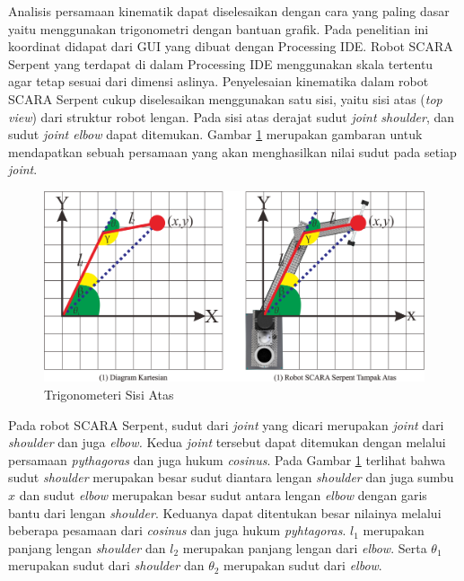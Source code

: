 Analisis persamaan kinematik dapat diselesaikan dengan cara yang paling dasar yaitu menggunakan trigonometri dengan bantuan grafik. Pada penelitian ini koordinat didapat dari GUI yang dibuat dengan Processing IDE. Robot SCARA Serpent yang terdapat di dalam Processing IDE menggunakan skala tertentu agar tetap sesuai dari dimensi aslinya. Penyelesaian kinematika dalam robot SCARA Serpent cukup diselesaikan menggunakan satu sisi, yaitu sisi atas (\textit{top view}) dari struktur robot lengan. Pada sisi atas derajat sudut \textit{joint} \textit{shoulder}, dan sudut \textit{joint elbow} dapat ditemukan. Gambar \ref{pic.perskinematikabalik} merupakan gambaran untuk mendapatkan sebuah persamaan yang akan menghasilkan nilai sudut pada setiap \textit{joint\cite{koker}}.
\begin{figure}[H]
	\centering
	\includegraphics[width=12cm]{gambar/SCARA_atas.png}
	\caption{Trigonometeri Sisi Atas}
	\label{pic.perskinematikabalik}
\end{figure}


Pada robot SCARA Serpent, sudut dari \textit{joint} yang dicari merupakan \textit{joint} dari \textit{shoulder} dan juga \textit{elbow.} Kedua \textit{joint} tersebut dapat ditemukan dengan melalui persamaan \textit{pythagoras} dan juga hukum \textit{cosinus}. Pada Gambar \ref{pic.perskinematikabalik} terlihat bahwa sudut \textit{shoulder} merupakan besar sudut diantara lengan \textit{shoulder} dan juga sumbu $x$ dan sudut \textit{elbow} merupakan besar sudut antara lengan \textit{elbow} dengan garis bantu dari lengan \textit{shoulder}. Keduanya dapat ditentukan besar nilainya melalui beberapa pesamaan dari \textit{cosinus} dan juga hukum \textit{pyhtagoras}. $l_{1}$ merupakan panjang lengan \textit{shoulder} dan $l_{2}$ merupakan panjang lengan dari \textit{elbow}. Serta $\theta_{1}$ merupakan sudut dari \textit{shoulder} dan $\theta_{2}$ merupakan sudut dari \textit{elbow}\cite{victor}.  

